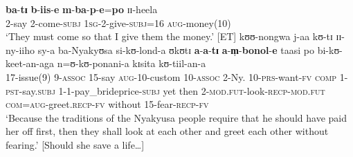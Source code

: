 \begin{exe}
\ex \gll \textbf{ba}-\textbf{tɪ} \textbf{b}-\textbf{iis}-\textbf{e} \textbf{m}-\textbf{ba}-\textbf{p}-\textbf{e}=\textbf{po} ɪɪ-heela\\
2-say 2-come-\textsc{subj} \textsc{1sg}-2-give-\textsc{subj}=16 \textsc{aug}-money(10)\\
\glt `They must come so that I give them the money.' [ET]
\ex\label{exSUBJati}
\gll kʊʊ-nongwa j-aa kʊ-tɪ ɪɪ-ny-iiho sy-a ba-Nyakyʊsa si-kʊ-lond-a ʊkʊtɪ \textbf{a}-\textbf{a}-\textbf{tɪ} \textbf{a}-\textbf{m̩}-\textbf{bonol}-\textbf{e} taasi po bi-kʊ-keet-an-aga n=ʊ-kʊ-ponani-a kɪsita kʊ-tiil-an-a\\
17-issue(9) 9-\textsc{assoc} 15-say \textsc{aug}-10-custom 10-\textsc{assoc} 2-Ny. 10-\textsc{prs}-want-\textsc{fv} \textsc{comp} 1-\textsc{pst}-say.\textsc{subj} 1-1-pay\_brideprice-\textsc{subj} yet then 2-\textsc{mod.fut}-look-\textsc{recp}-\textsc{mod.fut} \textsc{com}=\textsc{aug}-greet.\textsc{recp}-\textsc{fv} without 15-fear-\textsc{recp}-\textsc{fv}\\
\glt `‎Because the traditions of the Nyakyusa people require that he should have paid her off first, then they shall look at each other and greet each other without fearing.' [Should she save a life\ldots]
\end{exe}

